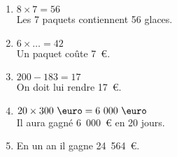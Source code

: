 \exo{}

\begin{enumerate}[itemsep=.8em]
	\item $8\times7=56$\\
	Les 7 paquets contiennent 56 glaces.
	\item $6\times\ldots=42$\\
	Un paquet coûte 7~€.
	\item $200-183=17$\\
	On doit lui rendre 17~€.
	\item $20\times300~\text{\euro}=6~000~\text{\euro}$\\
	Il aura gagné 6~000~€ en 20 jours.
	\item {}
	 \hspace{2cm}
	En un an il gagne 24~564~€.

\end{enumerate}